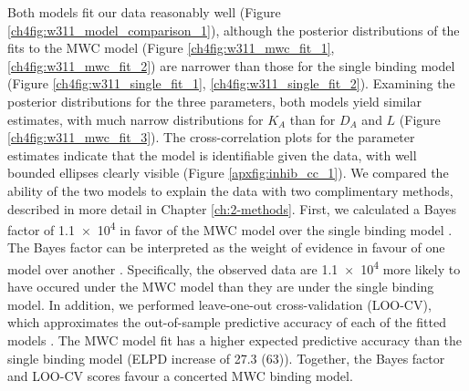 Both models fit our data reasonably well (Figure \ref{ch4fig:w311_model_comparison_1}), although the posterior distributions of the fits to the MWC model (Figure \ref{ch4fig:w311_mwc_fit_1}, \ref{ch4fig:w311_mwc_fit_2}) are narrower than those for the single binding model (Figure \ref{ch4fig:w311_single_fit_1}, \ref{ch4fig:w311_single_fit_2}).
Examining the posterior distributions for the three parameters, both models yield similar estimates, with much narrow distributions for $K_A$ than for $D_A$ and $L$ (Figure \ref{ch4fig:w311_mwc_fit_3}).
The cross-correlation plots for the parameter estimates indicate that the model is identifiable given the data, with well bounded ellipses clearly visible (Figure \ref{apxfig:inhib_cc_1}).
We compared the ability of the two models to explain the data with two complimentary methods, described in more detail in Chapter \ref{ch:2-methods}.
First, we calculated a Bayes factor of \num{1.1e4} in favor of the MWC model over the single binding model \cite{gronau_bridgesampling_2020}.
The Bayes factor can be interpreted as the weight of evidence in favour of one model over another \cite{wagenmakers_practical_2007}.
Specifically, the observed data are \num{1.1e4} more likely to have occured under the MWC model than they are under the single binding model.
In addition, we performed leave-one-out cross-validation (LOO-CV), which approximates the out-of-sample predictive accuracy of each of the fitted models \cite{vehtari_practical_2017}.
The MWC model fit has a higher expected predictive accuracy than the single binding model (ELPD increase of \num{27.3 (63)}).
Together, the Bayes factor and LOO-CV scores favour a concerted MWC binding model.

